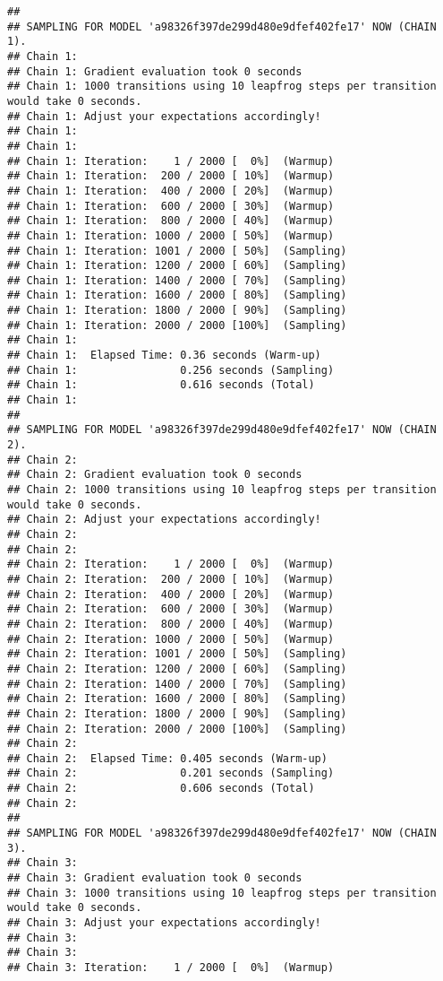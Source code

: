 \documentclass[
]{article}
\begin{document}
\begin{verbatim}
## 
## SAMPLING FOR MODEL 'a98326f397de299d480e9dfef402fe17' NOW (CHAIN 1).
## Chain 1: 
## Chain 1: Gradient evaluation took 0 seconds
## Chain 1: 1000 transitions using 10 leapfrog steps per transition would take 0 seconds.
## Chain 1: Adjust your expectations accordingly!
## Chain 1: 
## Chain 1: 
## Chain 1: Iteration:    1 / 2000 [  0%]  (Warmup)
## Chain 1: Iteration:  200 / 2000 [ 10%]  (Warmup)
## Chain 1: Iteration:  400 / 2000 [ 20%]  (Warmup)
## Chain 1: Iteration:  600 / 2000 [ 30%]  (Warmup)
## Chain 1: Iteration:  800 / 2000 [ 40%]  (Warmup)
## Chain 1: Iteration: 1000 / 2000 [ 50%]  (Warmup)
## Chain 1: Iteration: 1001 / 2000 [ 50%]  (Sampling)
## Chain 1: Iteration: 1200 / 2000 [ 60%]  (Sampling)
## Chain 1: Iteration: 1400 / 2000 [ 70%]  (Sampling)
## Chain 1: Iteration: 1600 / 2000 [ 80%]  (Sampling)
## Chain 1: Iteration: 1800 / 2000 [ 90%]  (Sampling)
## Chain 1: Iteration: 2000 / 2000 [100%]  (Sampling)
## Chain 1: 
## Chain 1:  Elapsed Time: 0.36 seconds (Warm-up)
## Chain 1:                0.256 seconds (Sampling)
## Chain 1:                0.616 seconds (Total)
## Chain 1: 
## 
## SAMPLING FOR MODEL 'a98326f397de299d480e9dfef402fe17' NOW (CHAIN 2).
## Chain 2: 
## Chain 2: Gradient evaluation took 0 seconds
## Chain 2: 1000 transitions using 10 leapfrog steps per transition would take 0 seconds.
## Chain 2: Adjust your expectations accordingly!
## Chain 2: 
## Chain 2: 
## Chain 2: Iteration:    1 / 2000 [  0%]  (Warmup)
## Chain 2: Iteration:  200 / 2000 [ 10%]  (Warmup)
## Chain 2: Iteration:  400 / 2000 [ 20%]  (Warmup)
## Chain 2: Iteration:  600 / 2000 [ 30%]  (Warmup)
## Chain 2: Iteration:  800 / 2000 [ 40%]  (Warmup)
## Chain 2: Iteration: 1000 / 2000 [ 50%]  (Warmup)
## Chain 2: Iteration: 1001 / 2000 [ 50%]  (Sampling)
## Chain 2: Iteration: 1200 / 2000 [ 60%]  (Sampling)
## Chain 2: Iteration: 1400 / 2000 [ 70%]  (Sampling)
## Chain 2: Iteration: 1600 / 2000 [ 80%]  (Sampling)
## Chain 2: Iteration: 1800 / 2000 [ 90%]  (Sampling)
## Chain 2: Iteration: 2000 / 2000 [100%]  (Sampling)
## Chain 2: 
## Chain 2:  Elapsed Time: 0.405 seconds (Warm-up)
## Chain 2:                0.201 seconds (Sampling)
## Chain 2:                0.606 seconds (Total)
## Chain 2: 
## 
## SAMPLING FOR MODEL 'a98326f397de299d480e9dfef402fe17' NOW (CHAIN 3).
## Chain 3: 
## Chain 3: Gradient evaluation took 0 seconds
## Chain 3: 1000 transitions using 10 leapfrog steps per transition would take 0 seconds.
## Chain 3: Adjust your expectations accordingly!
## Chain 3: 
## Chain 3: 
## Chain 3: Iteration:    1 / 2000 [  0%]  (Warmup)

\end{verbatim}
\end{document}
